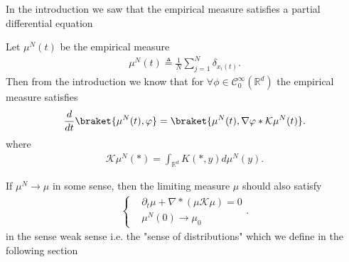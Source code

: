 In the introduction we saw that the empirical measure satisfies a partial differential equation
\begin{definition}
  Let $\mu ^{N}(t) $ be the empirical measure 
  \begin{align*}
    \mu ^{N }(t) \triangleq \frac{1}{N}  \sum_{j=1}^{N} \delta_{x_i(t)} 
  .\end{align*}
Then from the introduction we know that for $\forall \phi  \in \mathcal{C}_0^{\infty}(\mathbb{R}^{d} ) $  the empirical measure satisfies
\begin{align*}
  \frac{d}{dt} \braket{\mu^N(t),\phi } = \braket{\mu^N(t),\nabla \phi *\mathcal{K}\mu ^{N}(t) }
.\end{align*}
where 
\begin{align*}
  \mathcal{K}\mu ^{N}(*) = \int_{\mathbb{R}^{d} }  K(*,y) d\mu ^{N}(y) 
.\end{align*}
\end{definition}
\begin{idea}
 If $\mu ^{N} \to \mu  $  in some sense, then the limiting measure $\mu $ should also satisfy 
 \begin{align*}
  \begin{cases}
    &\partial_t \mu  + \nabla * (\mu \mathcal{K} \mu ) = 0 \\
    & \mu^N(0)   \to \mu_0
  \end{cases}
 .\end{align*}
 in the sense weak sense i.e. the "sense of distributions" which we define in the following section
\end{idea}
\newpage
